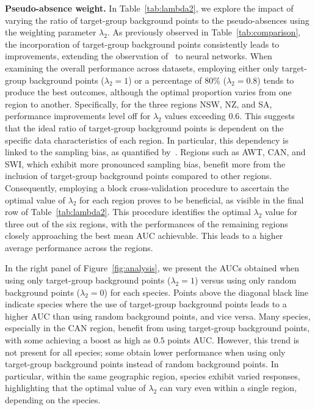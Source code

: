 \documentclass[3p,preprint,12pt]{elsarticle}
\begin{document}
\textbf{Pseudo-absence weight.} In Table~\ref{tab:lambda2}, we explore the impact of varying the ratio of target-group background points to the pseudo-absences using the weighting parameter $\lambda_2$. As previously observed in Table~\ref{tab:comparison}, the incorporation of target-group background points consistently leads to improvements, extending the observation of~\cite{phillips2009sample} to neural networks. When examining the overall performance across datasets, employing either only target-group background points ($\lambda_2 = 1$) or a percentage of 80\% ($\lambda_2 = 0.8$) tends to produce the best outcomes, although the optimal proportion varies from one region to another. Specifically, for the three regions NSW, NZ, and SA, performance improvements level off for $\lambda_2$ values exceeding $0.6$. This suggests that the ideal ratio of target-group background points is dependent on the specific data characteristics of each region. In particular, this dependency is linked to the sampling bias, as quantified by~\cite{phillips2009sample}. Regions such as AWT, CAN, and SWI, which exhibit more pronounced sampling bias, benefit more from the inclusion of target-group background points compared to other regions. Consequently, employing a block cross-validation procedure to ascertain the optimal value of $\lambda_2$ for each region proves to be beneficial, as visible in the final row of Table~\ref{tab:lambda2}. This procedure identifies the optimal $\lambda_2$ value for three out of the six regions, with the performances of the remaining regions closely approaching the best mean AUC achievable. This leads to a higher average performance across the regions.



In the right panel of Figure~\ref{fig:analysis}, we present the AUCs obtained when using only target-group background points ($\lambda_2 = 1$) versus using only random background points ($\lambda_2 = 0$) for each species. Points above the diagonal black line indicate species where the use of target-group background points leads to a higher AUC than using random background points, and vice versa. Many species, especially in the CAN region, benefit from using target-group background points, with some achieving a boost as high as $0.5$ points AUC. However, this trend is not present for all species; some obtain lower performance when using only target-group background points instead of random background points. In particular, within the same geographic region, species exhibit varied responses, highlighting that the optimal value of $\lambda_2$ can vary even within a single region, depending on the species.
\end{document}
